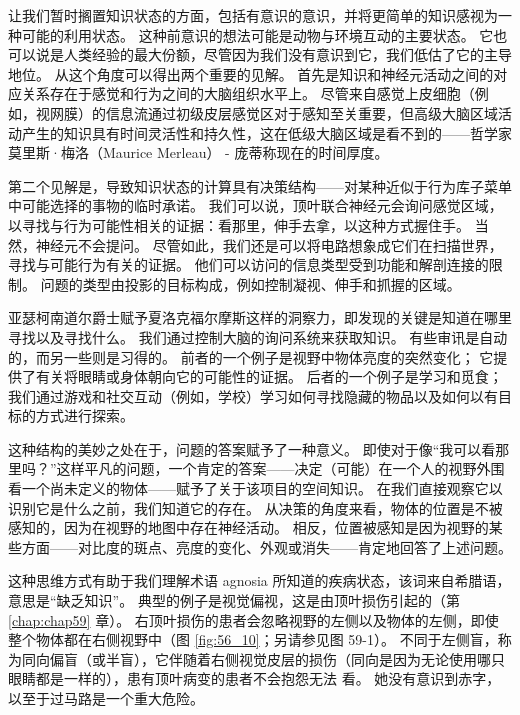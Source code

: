 让我们暂时搁置知识状态的方面，包括有意识的意识，并将更简单的知识感视为一种可能的利用状态。 这种前意识的想法可能是动物与环境互动的主要状态。 它也可以说是人类经验的最大份额，尽管因为我们没有意识到它，我们低估了它的主导地位。 从这个角度可以得出两个重要的见解。 首先是知识和神经元活动之间的对应关系存在于感觉和行为之间的大脑组织水平上。 尽管来自感觉上皮细胞（例如，视网膜）的信息流通过初级皮层感觉区对于感知至关重要，但高级大脑区域活动产生的知识具有时间灵活性和持久性，这在低级大脑区域是看不到的——哲学家莫里斯·梅洛（Maurice Merleau） - 庞蒂称现在的时间厚度。

第二个见解是，导致知识状态的计算具有决策结构——对某种近似于行为库子菜单中可能选择的事物的临时承诺。 我们可以说，顶叶联合神经元会询问感觉区域，以寻找与行为可能性相关的证据：看那里，伸手去拿，以这种方式握住手。 当然，神经元不会提问。 尽管如此，我们还是可以将电路想象成它们在扫描世界，寻找与可能行为有关的证据。 他们可以访问的信息类型受到功能和解剖连接的限制。 问题的类型由投影的目标构成，例如控制凝视、伸手和抓握的区域。

亚瑟柯南道尔爵士赋予夏洛克福尔摩斯这样的洞察力，即发现的关键是知道在哪里寻找以及寻找什么。 我们通过控制大脑的询问系统来获取知识。 有些审讯是自动的，而另一些则是习得的。 前者的一个例子是视野中物体亮度的突然变化； 它提供了有关将眼睛或身体朝向它的可能性的证据。 后者的一个例子是学习和觅食； 我们通过游戏和社交互动（例如，学校）学习如何寻找隐藏的物品以及如何以有目标的方式进行探索。

这种结构的美妙之处在于，问题的答案赋予了一种意义。 即使对于像“我可以看那里吗？”这样平凡的问题，一个肯定的答案——决定（可能）在一个人的视野外围看一个尚未定义的物体——赋予了关于该项目的空间知识。 在我们直接观察它以识别它是什么之前，我们知道它的存在。 从决策的角度来看，物体的位置是不被感知的，因为在视野的地图中存在神经活动。 相反，位置被感知是因为视野的某些方面——对比度的斑点、亮度的变化、外观或消失——肯定地回答了上述问题。

这种思维方式有助于我们理解术语 agnosia 所知道的疾病状态，该词来自希腊语，意思是“缺乏知识”。 典型的例子是视觉偏视，这是由顶叶损伤引起的（第 \ref{chap:chap59} 章）。 右顶叶损伤的患者会忽略视野的左侧以及物体的左侧，即使整个物体都在右侧视野中（图 \ref{fig:56_10}；另请参见图 59-1）。 不同于左侧盲，称为同向偏盲（或半盲），它伴随着右侧视觉皮层的损伤（同向是因为无论使用哪只眼睛都是一样的），患有顶叶病变的患者不会抱怨无法 看。 她没有意识到赤字，以至于过马路是一个重大危险。

